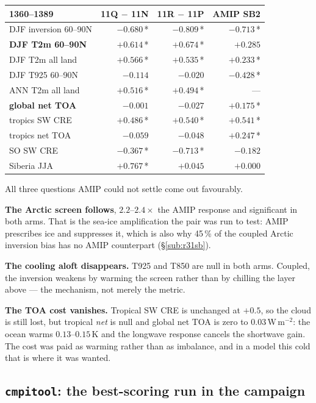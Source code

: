 \documentclass[10pt]{article}
\begin{document}
\begin{center}\small
\begin{tabular}{lrrr}
\toprule
1360--1389 & \textbf{11Q} $-$ 11N & \textbf{11R} $-$ 11P & AMIP SB2 \\
\midrule
DJF inversion 60--90N & $-0.680$\,* & $-0.809$\,* & $-0.713$\,* \\
\textbf{DJF T2m 60--90N} & $\mathbf{+0.614}$\,* & $\mathbf{+0.674}$\,* & $+0.285$ \\
DJF T2m all land & $+0.566$\,* & $+0.535$\,* & $+0.233$\,* \\
DJF T925 60--90N & $-0.114$ & $-0.020$ & $-0.428$\,* \\
ANN T2m all land & $+0.516$\,* & $+0.494$\,* & --- \\
\textbf{global net TOA} & $\mathbf{-0.001}$ & $\mathbf{-0.027}$ & $+0.175$\,* \\
tropics SW CRE & $+0.486$\,* & $+0.540$\,* & $+0.541$\,* \\
tropics net TOA & $-0.059$ & $-0.048$ & $+0.247$\,* \\
SO SW CRE & $-0.367$\,* & $-0.713$\,* & $-0.182$ \\
Siberia JJA & $+0.767$\,* & $+0.045$ & $+0.000$ \\
\bottomrule
\end{tabular}
\end{center}

All three questions AMIP could not settle come out favourably.

\textbf{The Arctic screen follows}, $2.2$--$2.4\times$ the AMIP response and significant in
both arms. That is the sea-ice amplification the pair was run to test: AMIP prescribes
ice and suppresses it, which is also why 45\,\% of the coupled Arctic inversion bias has
no AMIP counterpart (\S\ref{sub:r31sb}).

\textbf{The cooling aloft disappears.} T925 and T850 are null in both arms. Coupled, the
inversion weakens by warming the screen rather than by chilling the layer above --- the
mechanism, not merely the metric.

\textbf{The TOA cost vanishes.} Tropical SW CRE is unchanged at $+0.5$, so the cloud is
still lost, but tropical \emph{net} is null and global net TOA is zero to
$0.03$\,W\,m$^{-2}$: the ocean warms $0.13$--$0.15$\,K and the longwave response cancels
the shortwave gain. The cost was paid as warming rather than as imbalance, and in a model
this cold that is where it was wanted.

\subsection{\texttt{cmpitool}: the best-scoring run in the campaign}\label{sub:r32cmpi}
\end{document}
